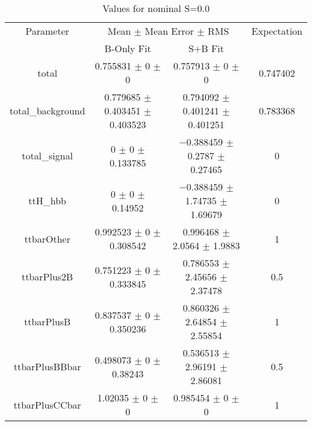 \begin{table}
\centering
\caption{Values for nominal S=0.0}
\begin{tabular}{cccc}
\toprule
Parameter & \multicolumn{2}{c}{Mean $\pm$ Mean Error $\pm$ RMS} & Expectation\\
 & B-Only Fit & S+B Fit & \\
\midrule
total & \num{0.755831} $\pm$ \num{0} $\pm$ \num{0} & \num{0.757913} $\pm$ \num{0} $\pm$ \num{0} & \num{0.747402}\\
total\_background & \num{0.779685} $\pm$ \num{0.403451} $\pm$ \num{0.403523} & \num{0.794092} $\pm$ \num{0.401241} $\pm$ \num{0.401251} & \num{0.783368}\\
total\_signal & \num{0} $\pm$ \num{0} $\pm$ \num{0.133785} & \num{-0.388459} $\pm$ \num{0.2787} $\pm$ \num{0.27465} & \num{0}\\
ttH\_hbb & \num{0} $\pm$ \num{0} $\pm$ \num{0.14952} & \num{-0.388459} $\pm$ \num{1.74735} $\pm$ \num{1.69679} & \num{0}\\
ttbarOther & \num{0.992523} $\pm$ \num{0} $\pm$ \num{0.308542} & \num{0.996468} $\pm$ \num{2.0564} $\pm$ \num{1.9883} & \num{1}\\
ttbarPlus2B & \num{0.751223} $\pm$ \num{0} $\pm$ \num{0.333845} & \num{0.786553} $\pm$ \num{2.45656} $\pm$ \num{2.37478} & \num{0.5}\\
ttbarPlusB & \num{0.837537} $\pm$ \num{0} $\pm$ \num{0.350236} & \num{0.860326} $\pm$ \num{2.64854} $\pm$ \num{2.55854} & \num{1}\\
ttbarPlusBBbar & \num{0.498073} $\pm$ \num{0} $\pm$ \num{0.38243} & \num{0.536513} $\pm$ \num{2.96191} $\pm$ \num{2.86081} & \num{0.5}\\
ttbarPlusCCbar & \num{1.02035} $\pm$ \num{0} $\pm$ \num{0} & \num{0.985454} $\pm$ \num{0} $\pm$ \num{0} & \num{1}\\
\bottomrule
\end{tabular}
\end{table}